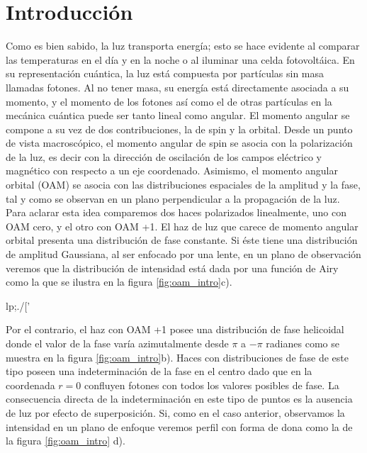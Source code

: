 


\chapter{Introducción}
\label{cha:Introduccion}

\graphicspath{{Figures/intro_img/}{../Figures/intro_img/}}

Como es bien sabido, la luz transporta energía; esto se hace evidente al
comparar las temperaturas en el día y en la noche o al iluminar una celda
fotovoltáica. En su representación cuántica, la luz está
compuesta por partículas sin masa llamadas fotones. Al no tener masa,
su energía está directamente asociada a su momento, y el momento de 
los fotones así como el de otras partículas en la mecánica cuántica puede ser tanto
lineal como angular. El momento angular se compone a su vez de dos
contribuciones, la de spin y la orbital. Desde un punto de vista 
macroscópico, el momento angular de spin se asocia con la polarización
de la luz, es decir con la dirección de oscilación de los campos
eléctrico y magnético con respecto a un eje coordenado. Asimismo, el
momento angular orbital (OAM) se asocia con las distribuciones
espaciales de la amplitud y la fase, tal y como se observan
en un plano perpendicular a la propagación de la luz. Para aclarar esta idea
comparemos dos haces polarizados linealmente, uno con OAM
cero, y el otro con OAM +1. El haz de luz que carece de momento
angular orbital presenta una distribución de fase constante. Si éste tiene una distribución de amplitud
Gaussiana, al ser enfocado por una lente, en un plano de
observación veremos que la distribución de intensidad está dada por una función de
Airy como la que se ilustra en la figura \ref{fig:oam_intro}c). 

lp;./['%

 Por el contrario, el haz con OAM +1 posee una distribución
 de fase helicoidal donde el valor de la fase varía azimutalmente
 desde $\pi$ a $-\pi$ radianes como se muestra  
en la  figura  \ref{fig:oam_intro}b). Haces con distribuciones de fase de este tipo poseen una
indeterminación de la fase en el centro dado que en la
coordenada $r=0$ confluyen fotones con todos los valores posibles de fase. La
consecuencia directa de la indeterminación en este tipo de puntos es
la ausencia de luz por efecto de superposición. Si, como en el caso
anterior, observamos la intensidad en un plano de enfoque veremos
perfil con forma de dona como la de la figura
\ref{fig:oam_intro} d). 


